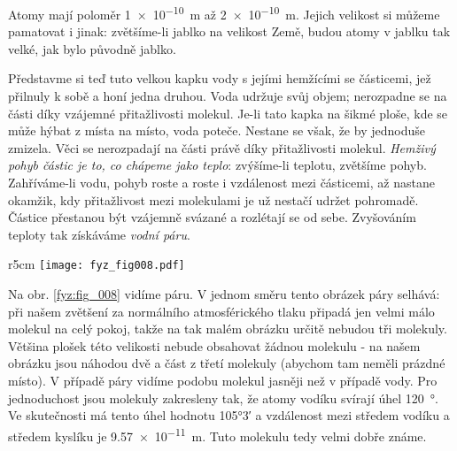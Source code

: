 {      Atomy mají poloměr \SI{1e-10}{\m} až \SI{2e-10}{\m}. Jejich velikost si můžeme pamatovat i 
      jinak: zvětšíme-li jablko na velikost Země, budou atomy v jablku tak velké, jak bylo původně 
      jablko.

      Představme si teď tuto velkou kapku vody s jejími hemžícími se částicemi, jež přilnuly k sobě 
      a honí jedna druhou. Voda udržuje svůj objem; nerozpadne se na části díky vzájemné 
      přitažlivosti molekul. Je-li tato kapka na šikmé ploše, kde se může hýbat z místa na místo, 
      voda poteče. Nestane se však, že by jednoduše zmizela. Věci se nerozpadají na části právě 
      díky přitažlivosti molekul. \emph{Hemživý pohyb částic je to, co chápeme jako teplo}: 
      zvýšíme-li teplotu, zvětšíme pohyb. Zahříváme-li vodu, pohyb roste a roste i vzdálenost mezi 
      částicemi, až nastane okamžik, kdy přitažlivost mezi molekulami je už nestačí udržet 
      pohromadě. Částice přestanou být vzájemně svázané a rozlétají se od sebe. Zvyšováním teploty 
      tak získáváme \emph{vodní páru}.  
      
      \begin{wrapfigure}[12]{r}{5cm}
        \centering
        \texttt{[image: fyz\_fig008.pdf]}
        \caption{Pára \cite[s.~18]{Feynman01}}
        \label{fyz:fig_008}
      \end{wrapfigure}
      Na obr. \ref{fyz:fig_008} vidíme páru. V jednom směru tento obrázek páry selhává: při našem 
      zvětšení za normálního atmosférického tlaku připadá jen velmi málo molekul na celý pokoj, 
      takže na tak malém obrázku určitě nebudou tři molekuly. Většina plošek této velikosti nebude 
      obsahovat žádnou molekulu - na našem obrázku jsou náhodou dvě a část z třetí molekuly 
      (abychom tam neměli prázdné místo). V případě páry vidíme podobu molekul jasněji než v 
      případě vody. Pro jednoduchost jsou molekuly zakresleny tak, že atomy vodíku svírají úhel 
      \SI{120}{\degree}. Ve skutečnosti má tento úhel hodnotu \ang[arc-separator = \,]{105;3;} a 
      vzdálenost mezi středem vodíku a středem kyslíku je \SI{9.57e-11}{\m}. Tuto molekulu tedy 
      velmi dobře známe.

}
